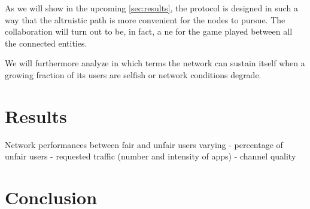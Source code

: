 \documentclass[conference]{IEEEtran}
\begin{document}
As we will show in the upcoming \autoref{sec:results}, the protocol is designed
in such a way that the altruistic path is more convenient for the nodes to
pursue. The collaboration will turn out to be, in fact, a \gls{ne} for the game
played between all the connected entities.

We will furthermore analyze in which terms the network can sustain itself when a
growing fraction of its users are selfish or network conditions degrade.


\section{Results} \label{sec:results}

Network performances between fair and unfair users varying
- percentage of unfair users
- requested traffic (number and intensity of apps)
- channel quality

\section{Conclusion}



\end{document}
